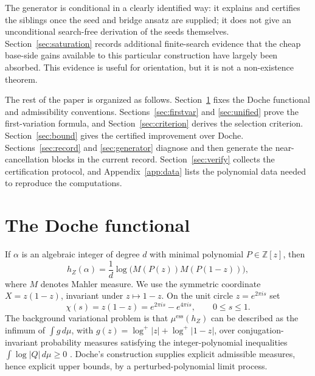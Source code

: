 \documentclass[11pt,reqno]{amsart}
\theoremstyle{plain}
\theoremstyle{definition}
\theoremstyle{remark}
\newcommand{\Z}{\mathbb{Z}}
\newcommand{\hZ}{h_Z}
\newcommand{\essmin}{\mu^{\mathrm{ess}}(\hZ)}
\begin{document}
The generator is conditional in a clearly identified way: it explains and certifies the
siblings once the seed and bridge ansatz are supplied; it does not give an unconditional
search-free derivation of the seeds themselves.  Section~\ref{sec:saturation} records
additional finite-search evidence that the cheap base-side gains available to this
particular construction have largely been absorbed.  This evidence is useful for
orientation, but it is not a non-existence theorem.

The rest of the paper is organized as follows.  Section~\ref{sec:functional} fixes the
Doche functional and admissibility conventions.  Sections~\ref{sec:firstvar} and
\ref{sec:unified} prove the first-variation formula, and Section~\ref{sec:criterion}
derives the selection criterion.  Section~\ref{sec:bound} gives the certified
improvement over Doche.  Sections~\ref{sec:record} and \ref{sec:generator} diagnose and
then generate the near-cancellation blocks in the current record.  Section~\ref{sec:verify}
collects the certification protocol, and Appendix~\ref{app:data} lists the polynomial
data needed to reproduce the computations.

\section{The Doche functional}\label{sec:functional}

If $\alpha$ is an algebraic integer of degree $d$ with minimal polynomial
$P\in\Z[z]$, then
\[
  \hZ(\alpha)=\frac1d\log\bigl(M(P(z))M(P(1-z))\bigr),
\]
where $M$ denotes Mahler measure.  We use the symmetric coordinate
$X=z(1-z)$, invariant under $z\mapsto1-z$.  On the unit circle $z=e^{2\pi i s}$ set
\[
  \chi(s)=z(1-z)=e^{2\pi i s}-e^{4\pi i s},\qquad 0\le s\le1.
\]
The background variational problem is that $\essmin$ can be described as the infimum
of $\int g\,d\mu$, with $g(z)=\log^+|z|+\log^+|1-z|$, over conjugation-invariant
probability measures satisfying the integer-polynomial inequalities
$\int\log|Q|\,d\mu\ge0$ \citep[Thm.~6.5]{BMQS}.  Doche's construction supplies explicit
admissible measures, hence explicit upper bounds, by a perturbed-polynomial limit
process.
\end{document}
